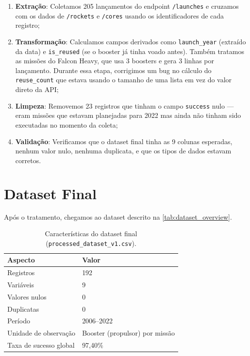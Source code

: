 \begin{enumerate}
    \item \textbf{Extração}: Coletamos 205 lançamentos do endpoint \texttt{/launches} e cruzamos com os dados de \texttt{/rockets} e \texttt{/cores} usando os identificadores de cada registro;
    \item \textbf{Transformação}: Calculamos campos derivados como \texttt{launch\_year} (extraído da data) e \texttt{is\_reused} (se o booster já tinha voado antes). Também tratamos as missões do Falcon Heavy, que usa 3 boosters e gera 3 linhas por lançamento. Durante essa etapa, corrigimos um bug no cálculo do \texttt{reuse\_count} que estava usando o tamanho de uma lista em vez do valor direto da API;
    \item \textbf{Limpeza}: Removemos 23 registros que tinham o campo \texttt{success} nulo — eram missões que estavam planejadas para 2022 mas ainda não tinham sido executadas no momento da coleta;
    \item \textbf{Validação}: Verificamos que o dataset final tinha as 9 colunas esperadas, nenhum valor nulo, nenhuma duplicata, e que os tipos de dados estavam corretos.
\end{enumerate}

\section{Dataset Final}

Após o tratamento, chegamos ao dataset descrito na \autoref{tab:dataset_overview}.

\begin{table}[H]
\centering
\caption{Características do dataset final (\texttt{processed\_dataset\_v1.csv}).}
\label{tab:dataset_overview}
\begin{tabular}{ll}
\toprule
\textbf{Aspecto}              & \textbf{Valor} \\
\midrule
Registros                      & 192 \\
Variáveis                     & 9 \\
Valores nulos                  & 0 \\
Duplicatas                     & 0 \\
Período                        & 2006--2022 \\
Unidade de observação          & Booster (propulsor) por missão \\
Taxa de sucesso global         & 97,40\% \\
\bottomrule
\end{tabular}
\end{table}

